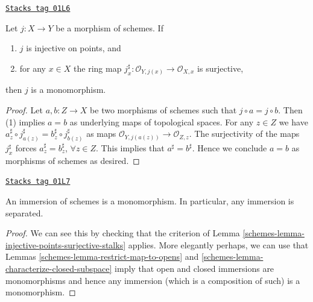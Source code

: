 \begin{lemma}
\label{schemes-lemma-injective-points-surjective-stalks}
\href{https://stacks.math.columbia.edu/tag/01L6}{\texttt{Stacks tag 01L6}}

Let $j : X \to Y$ be a morphism of schemes.
If
\begin{enumerate}
\item $j$ is injective on points, and
\item for any $x \in X$ the ring map
$j^\sharp_x : \mathcal{O}_{Y, j(x)} \to \mathcal{O}_{X, x}$
is surjective,
\end{enumerate}
then $j$ is a monomorphism.
\end{lemma}

\begin{proof}
Let $a, b : Z \to X$ be two morphisms of schemes such that
$j \circ a  = j \circ b$.
Then (1) implies $a = b$ as underlying
maps of topological spaces.
For any $z \in Z$ we have
$a^\sharp_z \circ j^\sharp_{a(z)} = b^\sharp_z \circ j^\sharp_{b(z)}$
as maps $\mathcal{O}_{Y, j(a(z))} \to \mathcal{O}_{Z, z}$.
The surjectivity of the maps
$j^\sharp_x$ forces $a^\sharp_z = b^\sharp_z$, $\forall z \in Z$.
This implies that $a^\sharp = b^\sharp$.
Hence we conclude $a = b$ as morphisms of schemes
as desired.
\end{proof}

\begin{lemma}
\label{schemes-lemma-immersions-monomorphisms}
\href{https://stacks.math.columbia.edu/tag/01L7}{\texttt{Stacks tag 01L7}}

An immersion of schemes is a monomorphism.
In particular, any immersion is separated.
\end{lemma}

\begin{proof}

We can see this by checking that the criterion of
Lemma \ref{schemes-lemma-injective-points-surjective-stalks} applies.
More elegantly perhaps, we can use that
Lemmas \ref{schemes-lemma-restrict-map-to-opens} and
\ref{schemes-lemma-characterize-closed-subspace} imply that
open and closed immersions are monomorphisms and hence
any immersion (which is a composition of such)
is a monomorphism.
\end{proof}

